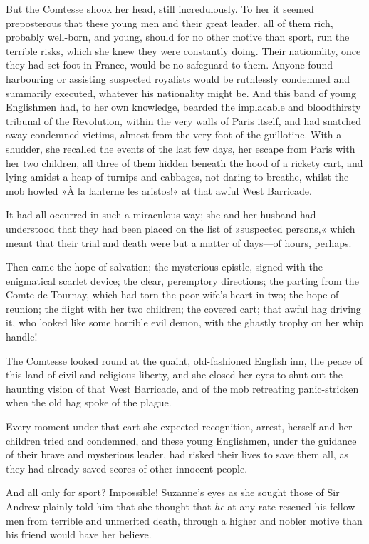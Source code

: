 But the Comtesse shook her head, still incredulously. To her it seemed preposterous that these young men and their great leader, all of them rich, probably well-born, and young, should for no other motive than sport, run the terrible risks, which she knew they were constantly doing. Their nationality, once they had set foot in France, would be no safeguard to them. Anyone found harbouring or assisting suspected royalists would be ruthlessly condemned and summarily executed, whatever his nationality might be. And this band of young Englishmen had, to her own knowledge, bearded the implacable and bloodthirsty tribunal of the Revolution, within the very walls of Paris itself, and had snatched away condemned victims, almost from the very foot of the guillotine. With a shudder, she recalled the events of the last few days, her escape from Paris with her two children, all three of them hidden beneath the hood of a rickety cart, and lying amidst a heap of turnips and cabbages, not daring to breathe, whilst the mob howled »À la lanterne les aristos!« at that awful West Barricade.

It had all occurred in such a miraculous way; she and her husband had understood that they had been placed on the list of »suspected persons,« which meant that their trial and death were but a matter of days\allowbreak---\allowbreak of hours, perhaps.

Then came the hope of salvation; the mysterious epistle, signed with the enigmatical scarlet device; the clear, peremptory directions; the parting from the Comte de Tournay, which had torn the poor wife's heart in two; the hope of reunion; the flight with her two children; the covered cart; that awful hag driving it, who looked like some horrible evil demon, with the ghastly trophy on her whip handle!

The Comtesse looked round at the quaint, old-fashioned English inn, the peace of this land of civil and religious liberty, and she closed her eyes to shut out the haunting vision of that West Barricade, and of the mob retreating panic-stricken when the old hag spoke of the plague.

Every moment under that cart she expected recognition, arrest, herself and her children tried and condemned, and these young Englishmen, under the guidance of their brave and mysterious leader, had risked their lives to save them all, as they had already saved scores of other innocent people.

And all only for sport? Impossible! Suzanne's eyes as she sought those of Sir Andrew plainly told him that she thought that \textit{he} at any rate rescued his fellow-men from terrible and unmerited death, through a higher and nobler motive than his friend would have her believe.


